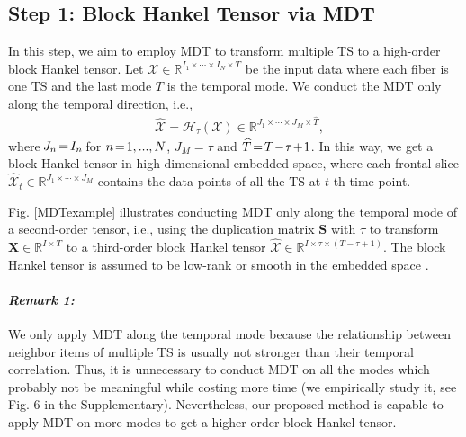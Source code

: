 \documentclass[letterpaper]{article} %
\numberwithin{theorem}{section}
\newcommand{\ten}[1]{ \boldsymbol{\mathcal #1}}
\newcommand{\bbR}[1]{\mathbb{R}^{#1}}
\begin{document}
\subsection{Step 1: Block Hankel Tensor via  MDT} 

In this step, we  aim to employ MDT to transform multiple  TS  to  a   high-order block Hankel tensor.     Let $\ten{X} \in \bbR{I_1 \times \cdots \times I_N\times T}$ be the input  data where  each fiber  is one TS and  the last mode $T$ is the temporal mode.  We conduct the MDT only along the temporal direction, i.e.,  
\begin{equation}\label{MDTforX}
\begin{aligned}
&{\widehat{\ten{X}}} = \mathcal{H}_{\tau} (\ten{X}) \in \bbR{J_1 \times \cdots \times J_M \times \widehat{T}}, 
\end{aligned} 
\end{equation}
where $\hspace{-0.05cm} J_n\hspace{-0.05cm} =\hspace{-0.05cm}I_n\hspace{-0.05cm}$  for  $n\hspace{-0.05cm}=\hspace{-0.05cm}1, ...,N$, $J_M=\tau$ and  $\widehat{T} \hspace{-0.05cm} = \hspace{-0.05cm} T \hspace{-0.05cm} -\hspace{-0.05cm} \tau\hspace{-0.05cm}  + \hspace{-0.05cm}1$. In this way, we get a block Hankel tensor in   high-dimensional embedded space, where each frontal slice  ${\widehat{\ten{X}}_t} \in \bbR{J_1 \times \cdots \times J_M}$ contains  the data points of all the TS  at $t$-th time point. 

Fig. \ref{MDTexample} illustrates   conducting  MDT only along the temporal mode of a second-order tensor, i.e.,  using the duplication matrix  $\mathbf S$ with $\tau$ to transform   $\mathbf{X} \in \bbR{I \times T}$ to  a third-order block Hankel tensor $\widehat{\ten{X}  } \in \bbR{I \times  \tau \times {(T-\tau+1)} }$.    The  block Hankel tensor is assumed to be  low-rank  or smooth in the embedded space \cite{yokota2018missing}.  







\paragraph{\textit{Remark 1:}}   We   only apply MDT along the temporal mode because   the   relationship  between neighbor  items  of multiple TS    is usually not  stronger than their temporal correlation.  Thus, it is unnecessary to conduct MDT on all the modes   which probably not be meaningful while costing  more time (we  empirically study it, see Fig. 6 in the Supplementary). Nevertheless, our proposed method is capable to apply MDT on more modes to get a higher-order block Hankel tensor. 
\end{document}
